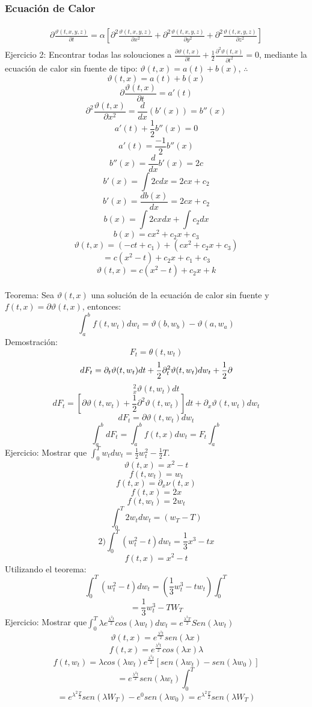 \documentclass[11pt,fleqn]{book} %
\numberwithin{equation}{section} %
\numberwithin{figure}{section} %
\numberwithin{table}{section} %
\begin{document}
\subsubsection{Ecuación de Calor}
\textbf{}
\begin{align} 
\begin{split}
\partial \frac{\vartheta (t,x,y,z)}{\partial t}=\alpha \left [\partial^2 \frac{\vartheta (t,x,y,z)}{\partial x^2}+\partial^2 \frac{\vartheta (t,x,y,z)}{\partial y^2}+\partial^2 \frac{\vartheta (t,x,y,z)}{\partial z^2}  \right ]
\end{split}					
\end{align}
Ejercicio 2: Encontrar todas las solouciones a $ \frac{\partial \vartheta (t,x)}{\partial t} + \frac{1}{2}  \frac{\partial^{2} \vartheta (t,x)}{{\partial t}^{2}}  = 0$, mediante la ecuación de calor sin fuente de tipo: $\vartheta (t,x) = a(t)+ b(x)$, $\therefore$
$$\vartheta (t,x)=a(t)+b(x)$$
$$\partial \frac{\vartheta (t,x)}{\partial t}={a}'(t)$$
$$\partial^2 \frac{\vartheta (t,x)}{\partial x^2}=\frac{d}{dx}({b}'(x))={b}''(x)$$
$${a}'(t)+\frac{1}{2}{b}''(x)=0$$
$${a}'(t)=\frac{-1}{2}{b}''(x)$$
$${b}''(x)=\frac{d}{dx}{b}'(x)=2c$$
$${b}'(x)=\int 2cdx=2cx+c_2$$
$${b}'(x)=\frac{db(x)}{dx}=2cx+c_2$$
$$b(x)=\int 2cxdx+\int c_2dx$$
$$b(x)=cx^2+c_2x+c_3$$
$$\vartheta (t,x)=(-ct+c_1)+(cx^2+c_2x+c_3)$$
$$=c(x^2-t)+c_2x+c_1+c_3$$
$$\vartheta (t,x)=c(x^2-t)+c_2x+k$$
\ \\%
Teorema: Sea $ \vartheta (t,x)$ una solución de la ecuación de calor sin fuente y  $f(t,x)=\partial \vartheta (t,x)$, entonces:
$$\int_{a}^{b}f(t,w_t)dw_t=\vartheta (b,w_b)-\vartheta (a,w_a)$$
Demostración:
$$F_t=\theta (t,w_t)$$
$$dF_t=\partial_t \vartheta (t,w_t)dt+\frac{1}{2}\partial^2 _t\vartheta (t,w_t)dw_t+\frac{1}{2}\partial \\$$
$$^2_x\vartheta (t,w_t)dt$$
$$dF_t=\left [ \partial \vartheta (t,w_t)+\frac{1}{2}\partial ^2\vartheta (t,w_t) \right ]dt+\partial _x\vartheta (t,w_t)dw_t$$
$$dF_t=\partial \vartheta (t,w_t)dw_t$$
$$\int_{a}^{b}dF_t=\int_{a}^{b}f(t,x)dw_t=F_t\int_{a}^{b}$$
Ejercicio: Mostrar que $\int_{0}^{T}w_tdw_t=\frac{1}{2}w_t^2-\frac{1}{2}T $.
$$\vartheta (t,x)=x^2-t$$
$$f(t,w_t)=w_t$$
$$f(t,x)=\partial _x\nu (t,x)$$
$$f(t,x)=2x$$
$$f(t,w_t)=2w_t$$
$$\int_{0}^{T}2w_tdw_t=(w_T-T)$$
$$2) \int_{0}^{T}(w_t^2-t)dw_t=\frac{1}{3}x^3-tx$$
$$f(t,x)=x^2-t$$
Utilizando el teorema:
$$\int_{0}^{T}(w_t^2-t)dw_t=(\frac{1}{3}w_t^3-tw_t)\int_{0}^{T}$$
$$=\frac{1}{3}w_{t}^{3}-TW_{T}$$
Ejercicio: Mostrar que$\int_{0}^{T}\lambda e^\frac{\lambda ^2t}{2}cos(\lambda w_t)dw_t=e^\frac{\lambda ^2T}{2}Sen(\lambda w_t)$
$$\vartheta (t,x)=e^\frac{\lambda ^2t}{2}sen(\lambda x)$$
$$f(t,x)=e^\frac{\lambda ^2t}{2}cos(\lambda x)\lambda$$
$$f(t,w_t)=\lambda cos(\lambda w_t)e^\frac{\lambda ^2t}{2}\left [ sen(\lambda w_t)-sen(\lambda w_0) \right ]$$
$$ = e^\frac{\lambda ^2t}{2}sen(\lambda w_t)\int_{0}^{T}$$
$$ = e^{\lambda ^2\frac{T}{2}}sen(\lambda W_{T})-e^{0}sen(\lambda w_{0}) = e^{\lambda ^2\frac{T}{2}}sen(\lambda W_{T}) $$
\newpage
\end{document}
